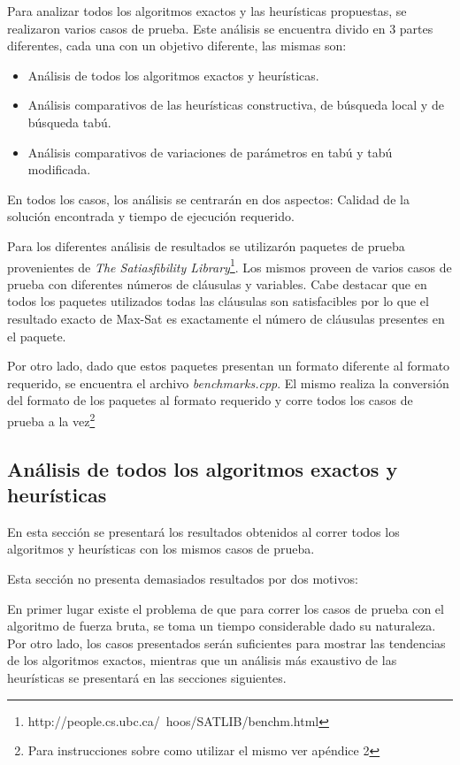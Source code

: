 \documentclass[a4paper,10pt]{article}
\begin{document}
Para analizar todos los algoritmos exactos y las heur\'isticas propuestas, se realizaron varios casos de prueba. Este an\'alisis se encuentra divido en 3 partes diferentes, cada una con un objetivo diferente, las mismas son:

\begin{itemize}
\item An\'alisis de todos los algoritmos exactos y heur\'isticas.
\item An\'alisis comparativos de las heur\'isticas constructiva, de b\'usqueda local y de b\'usqueda tab\'u.
\item An\'alisis comparativos de variaciones de par\'ametros en tab\'u y tab\'u modificada.
\end{itemize}
 

En todos los casos, los an\'alisis se centrar\'an en dos aspectos: Calidad de la soluci\'on encontrada y tiempo de ejecuci\'on requerido.

Para los diferentes an\'alisis de resultados se utilizar\'on paquetes de prueba provenientes de \emph{The Satiasfibility Library}\footnote{http://people.cs.ubc.ca/~hoos/SATLIB/benchm.html}. Los mismos proveen de varios casos de prueba con diferentes n\'umeros de cl\'ausulas y variables. Cabe destacar que en todos los paquetes utilizados todas las cl\'ausulas son satisfacibles por lo que el resultado exacto de Max-Sat es exactamente el n\'umero de cl\'ausulas presentes en el paquete.

Por otro lado, dado que estos paquetes presentan un formato diferente al formato requerido, se encuentra el archivo \emph{benchmarks.cpp}. El mismo realiza la conversi\'on del formato de los paquetes al formato requerido y corre todos los casos de prueba a la vez\footnote{Para instrucciones sobre como utilizar el mismo ver ap\'endice 2}

\subsection*{An\'alisis de todos los algoritmos exactos y heur\'isticas}

En esta secci\'on se presentar\'a los resultados obtenidos al correr todos los algoritmos y heur\'isticas con los mismos casos de prueba. 

Esta secci\'on no presenta demasiados resultados por dos motivos:

En primer lugar existe el problema de que para correr los casos de prueba con el algoritmo de fuerza bruta, se toma un tiempo considerable dado su naturaleza. Por otro lado, los casos presentados ser\'an suficientes para mostrar las tendencias de los algoritmos exactos, mientras que un an\'alisis m\'as exaustivo de las heur\'isticas se presentar\'a en las secciones siguientes.
\end{document}
